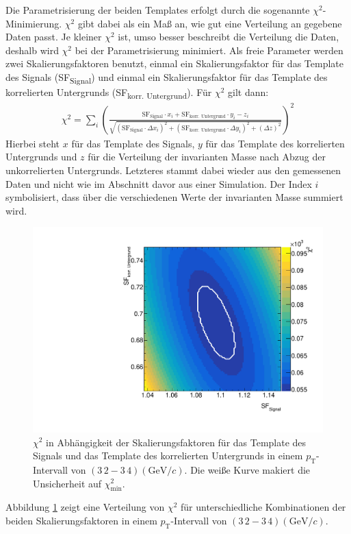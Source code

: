 Die Parametrisierung der beiden Templates erfolgt durch die sogenannte $\chi^{2}$-Minimierung.
$\chi^{2}$ gibt dabei als ein Maß an, wie gut eine Verteilung an gegebene Daten passt.
Je kleiner $\chi^{2}$ ist, umso besser beschreibt die Verteilung die Daten, deshalb wird $\chi^{2}$ bei der Parametrisierung minimiert.
Als freie Parameter werden zwei Skalierungsfaktoren benutzt, einmal ein Skalierungsfaktor für das Template des Signals (SF\textsubscript{Signal}) und einmal ein Skalierungsfaktor für das Template des korrelierten Untergrunds (SF\textsubscript{korr. Untergrund}).
Für $\chi^{2}$ gilt dann:
\begin{align}
\chi^{2} = \sum_{i}\left(\frac{\text{SF}_\text{Signal}\cdot x_{i}+\text{SF}_\text{korr. Untergrund}\cdot y_{i}-z_{i}}{\sqrt{\left(\text{SF}_\text{Signal}\cdot\Delta x_{i}\right)^{2}+\left(\text{SF}_\text{korr. Untergrund}\cdot\Delta y_{i}\right)^{2}+\left(\Delta z\right)^{2}}}\right)^{2}
\label{eq:Chi2}
\end{align}
Hierbei steht $x$ für das Template des Signals, $y$ für das Template des korrelierten Untergrunds und $z$ für die Verteilung der invarianten Masse nach Abzug der unkorrelierten Untergrunds.
Letzteres stammt dabei wieder aus den gemessenen Daten und nicht wie im Abschnitt davor aus einer Simulation.
Der Index $i$  symbolisiert, dass über die verschiedenen Werte der invarianten Masse summiert wird.
\begin{figure}[tp]
\centering
\includegraphics[width=.65\linewidth]{Chi2Map10_Data_2016.pdf}
\caption{$\chi^{2}$ in Abhängigkeit der Skalierungsfaktoren für das Template des Signals und das Template des korrelierten Untergrunds in einem $p_{\text{T}}$-Intervall von $(3\,2 - 3\,4)(\text{GeV}/c)$.
Die weiße Kurve makiert die Unsicherheit auf $\chi^{2}_\text{min}$.}
\label{fig:Chi2Map}
\end{figure}
\newline
Abbildung \ref{fig:Chi2Map} zeigt eine Verteilung von $\chi^{2}$ für unterschiedliche Kombinationen der beiden Skalierungsfaktoren in einem $p_{\text{T}}$-Intervall von $(3\,2 - 3\,4)(\text{GeV}/c)$.
